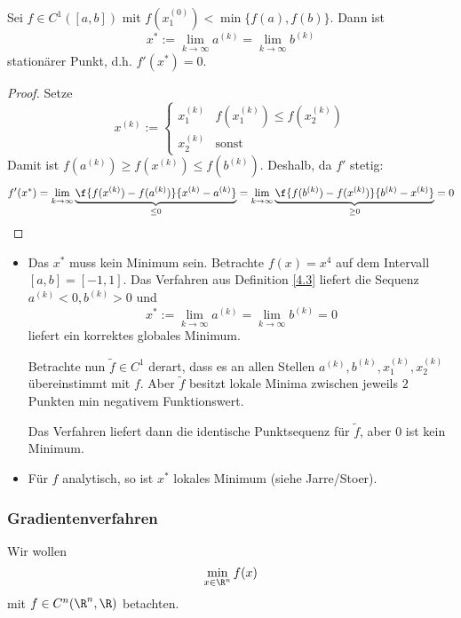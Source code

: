 \documentclass[11pt]{scrartcl}
\begin{document}
\begin{st} \label{4.5}
	Sei $f\in C^1([a,b])$ mit $f(x_1^{(0)}) < \min\{f(a),f(b)\}$.
	Dann ist
	\[
		x^* := \lim_{k\to \infty} a^{(k)} = \lim_{k\to \infty}b^{(k)}
	\]
	stationärer Punkt, d.h. $f'(x^*) = 0$.
	\begin{proof}
		Setze 
		\[
			x^{(k)} := \begin{cases}
				x_1^{(k)} & f(x_1^{(k)}) \le f(x_2^{(k)}) \\
				x_2^{(k)} & \text{sonst}
			\end{cases}
		\]
		Damit ist $f(a^{(k)}) \ge f(x^{(k)}) \le f(b^{(k)})$.
		Deshalb, da $f'$ stetig:
		\[
			f'(x^*) = \lim_{k\to \infty} \underbrace{\f {f(x^{(k)})-f(a^{(k)})}{x^{(k)}-a^{(k)}}}_{\le 0} = \lim_{k\to \infty} \underbrace{\f {f(b^{(k)})-f(x^{(k)})}{b^{(k)}-x^{(k)}}}_{\ge 0} = 0
		\]
	\end{proof}
	\begin{note}

		\begin{itemize}
			\item
				Das $x^*$ muss kein Minimum sein.
				Betrachte $f(x) = x^4$ auf dem Intervall $[a,b] = [-1,1]$.
				Das Verfahren aus Definition \ref{4.3} liefert die Sequenz $a^{(k)} < 0, b^{(k)} > 0$ und
				\[
					x^* := \lim_{k\to \infty}a^{(k)} = \lim_{k\to \infty} b^{(k)} = 0
				\]
				liefert ein korrektes globales Minimum.

				Betrachte nun $\tilde f\in C^1$ derart, dass es an allen Stellen $a^{(k)},b^{(k)},x_1^{(k)},x_2^{(k)}$ übereinstimmt mit $f$.
				Aber $\tilde f$ besitzt lokale Minima zwischen jeweils $2$ Punkten min negativem Funktionswert.

				Das Verfahren liefert dann die identische Punktsequenz für $\tilde f$, aber $0$ ist kein Minimum.
			\item
				Für $f$ analytisch, so ist $x^*$ lokales Minimum (siehe Jarre/Stoer).
		\end{itemize}
	\end{note}
\end{st}


\subsubsection{Gradientenverfahren}

Wir wollen
\[
	\min_{x\in \R^n} f(x)
\]
mit $f \in C^n (\R^n, \R)$ betachten.
\end{document}
